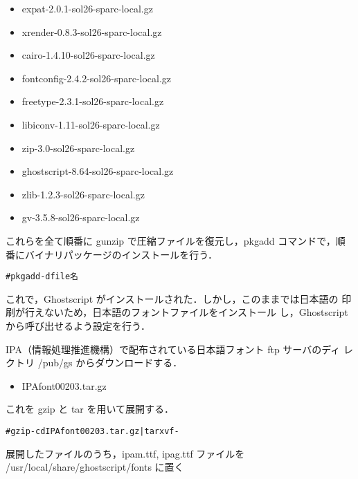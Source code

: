 \begin{itemize}
\item expat-2.0.1-sol26-sparc-local.gz
\item xrender-0.8.3-sol26-sparc-local.gz
\item cairo-1.4.10-sol26-sparc-local.gz
\item fontconfig-2.4.2-sol26-sparc-local.gz
\item freetype-2.3.1-sol26-sparc-local.gz
\item libiconv-1.11-sol26-sparc-local.gz
\item zip-3.0-sol26-sparc-local.gz
\item ghostscript-8.64-sol26-sparc-local.gz
\item zlib-1.2.3-sol26-sparc-local.gz
\item gv-3.5.8-sol26-sparc-local.gz
\end{itemize}

これらを全て順番に gunzip で圧縮ファイルを復元し，pkgadd コマンドで，順
番にバイナリパッケージのインストールを行う．

\begin{center}
\begin{breakbox}
\begin{alltt}
# pkgadd -d file名
\end{alltt}
\end{breakbox}
\end{center}

これで，Ghostscript がインストールされた．しかし，このままでは日本語の
印刷が行えないため，日本語のフォントファイルをインストール
し，Ghostscript から呼び出せるよう設定を行う．

IPA（情報処理推進機構）で配布されている日本語フォント ftp サーバのディ
レクトリ /pub/gs からダウンロードする．

\begin{itemize}
\item IPAfont00203.tar.gz
\end{itemize}

これを gzip と tar を用いて展開する．

\begin{center}
\begin{breakbox}
\begin{alltt}
# gzip -cd IPAfont00203.tar.gz | tar xvf -
\end{alltt}
\end{breakbox}
\end{center}

展開したファイルのうち，ipam.ttf, ipag.ttf ファイルを
/usr/local/share/ghostscript/fonts に置く

